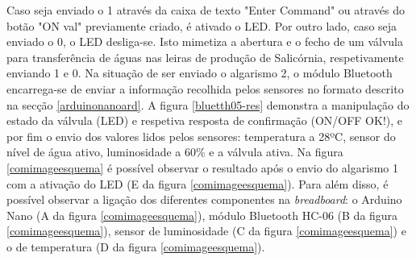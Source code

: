 Caso seja enviado o 1 através da caixa de texto "Enter Command" ou através do botão "ON val" previamente criado, é ativado o \ac{LED}. Por outro lado, caso seja enviado o 0,  o \ac{LED} desliga-se. Isto mimetiza a abertura e o fecho de um válvula para transferência de águas nas leiras de produção de Salicórnia, respetivamente enviando 1 e 0. Na situação de ser enviado o algarismo 2, o módulo Bluetooth encarrega-se de enviar a informação recolhida pelos sensores no formato descrito na secção \ref{arduinonanoard}. A figura \ref{bluetth05-res} demonstra a manipulação do estado da válvula (\ac{LED}) e respetiva resposta de confirmação (ON/OFF OK!), e por fim o envio dos valores lidos pelos sensores: temperatura a 28ºC, sensor do nível de água ativo, luminosidade a 60\% e a válvula ativa. Na figura \ref{comimageesquema} é possível observar o resultado após o envio do algarismo 1 com a ativação do \ac{LED} (E da figura \ref{comimageesquema}). Para além disso, é possível observar a ligação dos diferentes componentes na \textit{breadboard}: o Arduino Nano (A da figura \ref{comimageesquema}), módulo Bluetooth HC-06 (B da figura \ref{comimageesquema}), sensor de luminosidade (C da figura \ref{comimageesquema}) e o de temperatura (D da figura \ref{comimageesquema}). 


